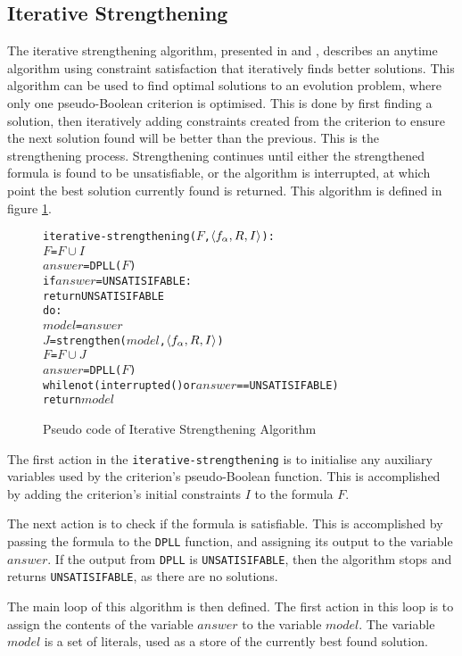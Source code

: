 \subsection{Iterative Strengthening}
The iterative strengthening algorithm, presented in \citep{calistri1994iterative} and \citep{le2010sat4j}, 
describes an anytime algorithm using constraint satisfaction that iteratively finds better solutions.
This algorithm can be used to find optimal solutions to an evolution problem, where only one pseudo-Boolean criterion is optimised.
This is done by first finding a solution, then iteratively adding constraints created from the criterion to ensure the next solution found will be better than the previous.
This is the strengthening process.
Strengthening continues until either the strengthened formula is found to be unsatisfiable, or the algorithm is interrupted, at which point the best solution currently found is returned. 
This algorithm is defined in figure \ref{impl.strength}.

\begin{figure}[htp]
\begin{center}
\begin{alltt}
iterative-strengthening(\(F\),\(\langle f\sb{\alpha}, R, I \rangle\)):
    \(F\) = \(F \cup I\)
    \(answer\) = DPLL(\(F\))
    if \(answer\) = UNSATISIFABLE:
        return UNSATISIFABLE
    do:
        \(model\) = \(answer\)
        \(J\) = strengthen(\(model\),\(\langle f\sb{\alpha}, R, I \rangle\))
        \(F\) = \(F \cup J\)
        \(answer\) = DPLL(\(F\))
    while not (interrupted() or  \(answer\) == UNSATISIFABLE)
    return \(model\) 
\end{alltt}
  \caption{Pseudo code of Iterative Strengthening Algorithm}
  \label{impl.strength}
\end{center}
\end{figure}

The first action in the \texttt{iterative-strengthening} is to initialise any auxiliary variables used by the criterion's pseudo-Boolean function.
This is accomplished by adding the criterion's initial constraints $I$ to the formula $F$.

The next action is to check if the formula is satisfiable.
This is accomplished by passing the formula to the \verb+DPLL+ function, and assigning its output to the variable $answer$.
If the output from \texttt{DPLL} is \texttt{UNSATISIFABLE}, then the algorithm stops and returns \texttt{UNSATISIFABLE}, as there are no solutions.

The main loop of this algorithm is then defined.
The first action in this loop is to assign the contents of the variable $answer$ to the variable $model$.
The variable $model$ is a set of literals, used as a store of the currently best found solution.

